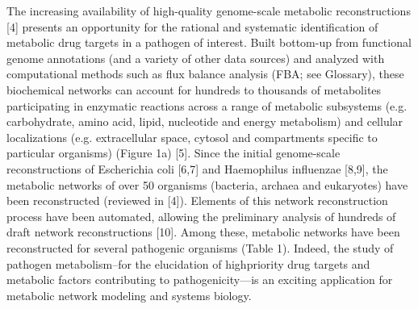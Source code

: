 The increasing availability of high-quality genome-scale 
metabolic reconstructions [4] presents an opportunity for the 
rational and systematic identification of metabolic drug 
targets in a pathogen of interest. Built bottom-up from functional 
genome annotations (and a variety of other data sources) and 
analyzed with computational methods such as flux balance analysis 
(FBA; see Glossary), these biochemical networks can account 
for hundreds to thousands of metabolites participating in enzymatic 
reactions across a range of metabolic subsystems (e.g. carbohydrate, 
amino acid, lipid, nucleotide and energy metabolism) and cellular 
localizations (e.g. extracellular space, cytosol and compartments 
specific to particular organisms) (Figure 1a) [5]. Since the 
initial genome-scale reconstructions of Escherichia coli [6,7] 
and Haemophilus influenzae [8,9], the metabolic networks of over 
50 organisms (bacteria, archaea and eukaryotes) have been 
reconstructed (reviewed in [4]). Elements of this network 
reconstruction process have been automated, allowing the preliminary 
analysis of hundreds of draft network reconstructions [10]. Among 
these, metabolic networks have been reconstructed for several pathogenic 
organisms (Table 1). Indeed, the study of pathogen metabolism–for the 
elucidation of highpriority drug targets and metabolic factors 
contributing to pathogenicity—is an exciting application for 
metabolic network modeling and systems biology.

